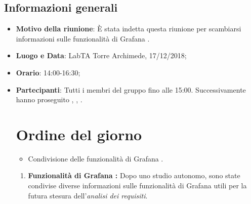 \documentclass[12pt]{article}
\begin{document}
    \subsection{Informazioni generali}
    \begin{itemize}
        \item \textbf{Motivo della riunione}: È stata indetta questa riunione per scambiarsi informazioni sulle funzionalità di Grafana   \pedice.
        \item \textbf{Luogo e Data}: LabTA Torre Archimede, 17/12/2018;
        \item \textbf{Orario}: 14:00-16:30;
        \item \textbf{Partecipanti}: Tutti i membri del gruppo fino alle 15:00. Successivamente hanno proseguito \daL, \daG, \mat.
        \newpage
        \section{Ordine del giorno}
        \begin{itemize}
        \item Condivisione delle funzionalità di Grafana \pedice .
        \end{itemize}
        
        \newpage
    \begin{enumerate}
    \section{Resoconto}
        \item \textbf{Funzionalità di Grafana \pedice:} Dopo uno studio autonomo, sono state condivise diverse informazioni sulle funzionalità di Grafana \pedice utili per la futura stesura dell'\textit{analisi dei requisiti}.
    \end{enumerate}

    \end{itemize}
\end{document}

